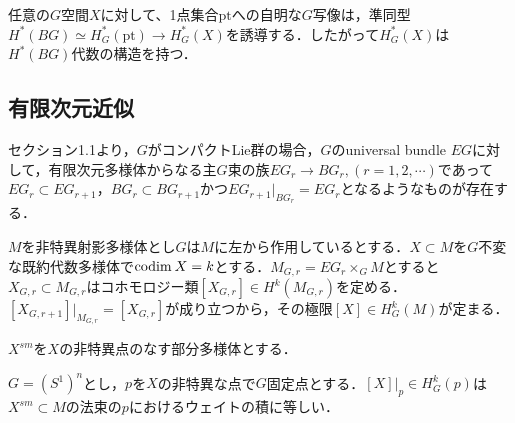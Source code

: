 任意の$G$空間$X$に対して、1点集合$\text{pt}$への自明な$G$写像は，準同型$H^*(BG)\simeq H^*_G(\text{pt})\rightarrow H^*_G(X)$を誘導する．したがって$H^*_G(X)$は$H^*(BG)$代数の構造を持つ．



\subsection{有限次元近似}

セクション1.1より，$G$がコンパクトLie群の場合，$G$のuniversal bundle $EG$に対して，有限次元多様体からなる主$G$束の族$EG_r\rightarrow BG_r, (r=1,2,\cdots)$であって$EG_r\subset EG_{r+1}$，$BG_r\subset BG_{r+1}$かつ$EG_{r+1}|_{BG_r} = EG_r$となるようなものが存在する．


$M$を非特異射影多様体とし$G$は$M$に左から作用しているとする．$X\subset M$を$G$不変な既約代数多様体で$\text{codim}\: X =k$とする．$M_{G,r}=EG_r\times_GM$とすると$X_{G,r}\subset M_{G,r}$はコホモロジー類$[X_{G,r}]\in H^k(M_{G,r})$を定める\cite{fulton young tableaux}．$[X_{G,r+1}]|_{M_{G,r}} = [X_{G,r}]$が成り立つから，その極限$[X]\in H^k_G(M)$が定まる．

$X^{sm}$を$X$の非特異点のなす部分多様体とする．

\begin{prop}\label{restriction to fixed point}
  $G=(S^1)^n$とし，$p$を$X$の非特異な点で$G$固定点とする．$[X]|_p\in H^k_G(p)$は$X^{sm}\subset M$の法束の$p$におけるウェイトの積に等しい．
\end{prop}

